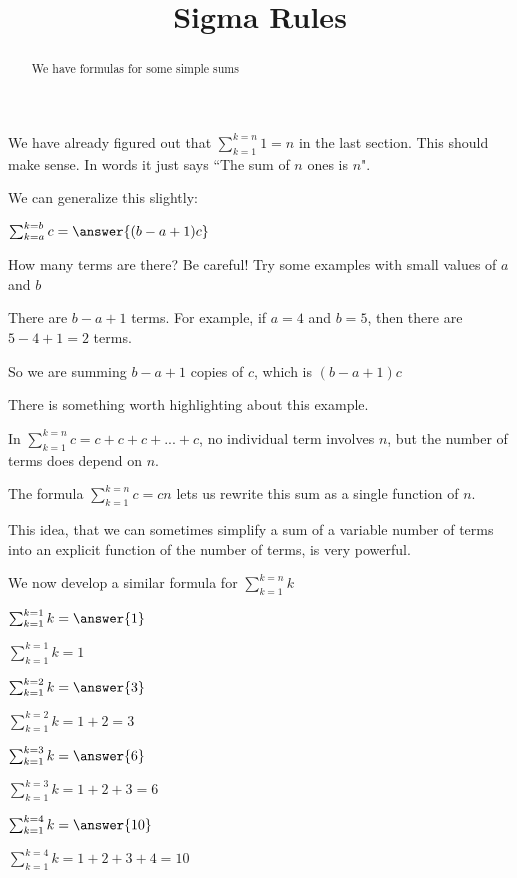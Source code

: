 \documentclass{ximera}
\title[Dig-In:]{Sigma Rules}
\begin{document}
\begin{abstract}
	We have formulas for some simple sums
\end{abstract}

We have already figured out that $\sum_{k=1}^{k=n} 1 = n$ in the last section.  This should make sense.  In words it just says ``The sum of $n$ ones is $n$".

We can generalize this slightly:

\begin{question}
	$\sum_{k=a}^{k=b} c = \answer{(b-a+1)c}$
	\begin{hint}
		How many terms are there?  Be careful!  Try some examples with small values of $a$ and $b$
	\end{hint}
	\begin{hint}
		There are $b-a+1$ terms.  For example, if $a=4$ and $b=5$, then there are $5-4+1 = 2$ terms.
	\end{hint}
	\begin{hint}
		So we are summing $b-a+1$ copies of $c$, which is $(b-a+1)c$
	\end{hint}
\end{question}

There is something worth highlighting about this example.

In $\sum_{k=1}^{k=n} c = c + c+ c+ ... + c$, no individual term involves $n$, but the number of terms does depend on $n$. 

The formula $\sum_{k=1}^{k=n} c = cn$ lets us rewrite this sum as a single function of $n$.

This idea, that we can sometimes simplify a sum of a variable number of terms into an explicit function of the number of terms, is very powerful.

We now develop a similar formula for $\sum_{k=1}^{k=n} k$

\begin{question}
	$\sum_{k=1}^{k=1} k = \answer{1}$
		\begin{hint}
			$\sum_{k=1}^{k=1} k = 1$
		\end{hint}
	
	$\sum_{k=1}^{k=2} k = \answer{3}$
		\begin{hint}
			$\sum_{k=1}^{k=2} k = 1+2 = 3$
		\end{hint}
	
	$\sum_{k=1}^{k=3} k = \answer{6}$
		\begin{hint}
			$\sum_{k=1}^{k=3} k = 1+2+3 = 6$
		\end{hint}
	
	$\sum_{k=1}^{k=4} k = \answer{10}$
		\begin{hint}
			$\sum_{k=1}^{k=4} k = 1+2+3+4 = 10$
		\end{hint}
	
\end{question}  
\end{document}
